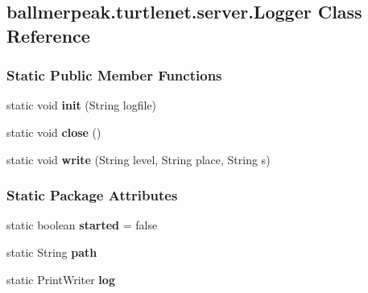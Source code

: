 \hypertarget{classballmerpeak_1_1turtlenet_1_1server_1_1Logger}{\subsection{ballmerpeak.\-turtlenet.\-server.\-Logger Class Reference}
\label{classballmerpeak_1_1turtlenet_1_1server_1_1Logger}
}
\subsubsection*{Static Public Member Functions}
\begin{DoxyCompactItemize}
\item 
\hypertarget{classballmerpeak_1_1turtlenet_1_1server_1_1Logger_aa23612b75f5e3ba1d77e1f2dc60ec514}{static void {\bfseries init} (String logfile)}\label{classballmerpeak_1_1turtlenet_1_1server_1_1Logger_aa23612b75f5e3ba1d77e1f2dc60ec514}

\item 
\hypertarget{classballmerpeak_1_1turtlenet_1_1server_1_1Logger_a529af97ac0cd6d79ca22f47aa75ccfe7}{static void {\bfseries close} ()}\label{classballmerpeak_1_1turtlenet_1_1server_1_1Logger_a529af97ac0cd6d79ca22f47aa75ccfe7}

\item 
\hypertarget{classballmerpeak_1_1turtlenet_1_1server_1_1Logger_aa3ebd83be6d967692fae7980eb7b146f}{static void {\bfseries write} (String level, String place, String s)}\label{classballmerpeak_1_1turtlenet_1_1server_1_1Logger_aa3ebd83be6d967692fae7980eb7b146f}

\end{DoxyCompactItemize}
\subsubsection*{Static Package Attributes}
\begin{DoxyCompactItemize}
\item 
\hypertarget{classballmerpeak_1_1turtlenet_1_1server_1_1Logger_acd0e511fcc5838a9fac44ea93121b196}{static boolean {\bfseries started} = false}\label{classballmerpeak_1_1turtlenet_1_1server_1_1Logger_acd0e511fcc5838a9fac44ea93121b196}

\item 
\hypertarget{classballmerpeak_1_1turtlenet_1_1server_1_1Logger_a708f083875f540ac0ef58e21eb4b0f9c}{static String {\bfseries path}}\label{classballmerpeak_1_1turtlenet_1_1server_1_1Logger_a708f083875f540ac0ef58e21eb4b0f9c}

\item 
\hypertarget{classballmerpeak_1_1turtlenet_1_1server_1_1Logger_a136d9200b2f7cc5b5fa6820a94e638f3}{static Print\-Writer {\bfseries log}}\label{classballmerpeak_1_1turtlenet_1_1server_1_1Logger_a136d9200b2f7cc5b5fa6820a94e638f3}

\end{DoxyCompactItemize}
